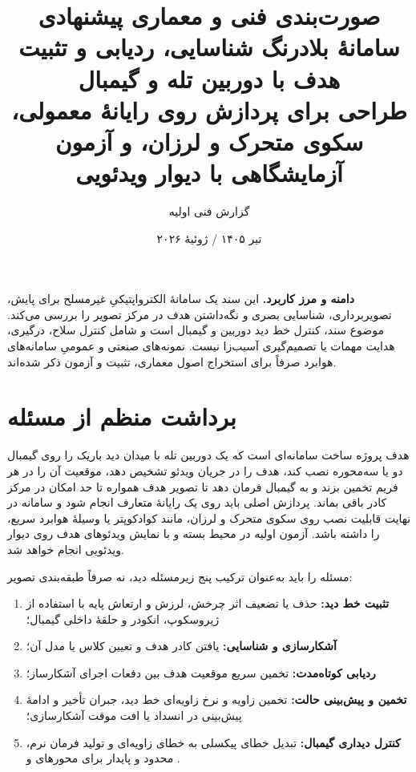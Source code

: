 \documentclass[12pt,a4paper]{article}
\title{\textbf{صورت‌بندی فنی و معماری پیشنهادی سامانهٔ بلادرنگ شناسایی، ردیابی و تثبیت هدف با دوربین تله و گیمبال \EN{Pan--Tilt}}\\[5pt]
\large طراحی برای پردازش روی رایانهٔ معمولی، سکوی متحرک و لرزان، و آزمون آزمایشگاهی با دیوار ویدئویی}
\author{گزارش فنی اولیه }
\date{تیر ۱۴۰۵ / ژوئیهٔ ۲۰۲۶}
\newcommand{\EN}[1]{\lr{#1}}
\begin{document}
\maketitle

\begin{tcolorbox}[colback=softgray,colframe=black!55,breakable]
\textbf{دامنه و مرز کاربرد.}
این سند یک سامانهٔ الکترواپتیکیِ غیرمسلح برای پایش، تصویربرداری، شناسایی بصری و نگه‌داشتن هدف در مرکز تصویر را بررسی می‌کند. موضوع سند، کنترل خط دید دوربین و گیمبال است و شامل کنترل سلاح، درگیری، هدایت مهمات یا تصمیم‌گیری آسیب‌زا نیست. نمونه‌های صنعتی و عمومیِ سامانه‌های هوابرد صرفاً برای استخراج اصول معماری، تثبیت و آزمون ذکر شده‌اند.
\end{tcolorbox}

\tableofcontents
\newpage

\section{برداشت منظم از مسئله}

هدف پروژه ساخت سامانه‌ای است که یک دوربین تله با میدان دید باریک را روی گیمبال دو یا سه‌محوره نصب کند، هدف را در جریان ویدئو تشخیص دهد، موقعیت آن را در هر فریم تخمین بزند و به گیمبال فرمان دهد تا تصویر هدف همواره تا حد امکان در مرکز کادر باقی بماند. پردازش اصلی باید روی یک رایانهٔ متعارف انجام شود و سامانه در نهایت قابلیت نصب روی سکوی متحرک و لرزان، مانند کوادکوپتر یا وسیلهٔ هوابرد سریع، را داشته باشد. آزمون اولیه در محیط بسته و با نمایش ویدئوهای هدف روی دیوار ویدئویی انجام خواهد شد.

مسئله را باید به‌عنوان ترکیب پنج زیرمسئله دید، نه صرفاً طبقه‌بندی تصویر:

\begin{enumerate}
    \item \textbf{تثبیت خط دید:} حذف یا تضعیف اثر چرخش، لرزش و ارتعاش پایه با استفاده از ژیروسکوپ، انکودر و حلقهٔ داخلی گیمبال؛
    \item \textbf{آشکارسازی و شناسایی:} یافتن کادر هدف و تعیین کلاس یا مدل آن؛
    \item \textbf{ردیابی کوتاه‌مدت:} تخمین سریع موقعیت هدف بین دفعات اجرای آشکارساز؛
    \item \textbf{تخمین و پیش‌بینی حالت:} تخمین زاویه و نرخ زاویه‌ای خط دید، جبران تأخیر و ادامهٔ پیش‌بینی در انسداد یا افت موقت آشکارسازی؛
    \item \textbf{کنترل دیداری گیمبال:} تبدیل خطای پیکسلی به خطای زاویه‌ای و تولید فرمان نرم، محدود و پایدار برای محورهای \EN{pan} و \EN{tilt}.
\end{enumerate}
\end{document}
